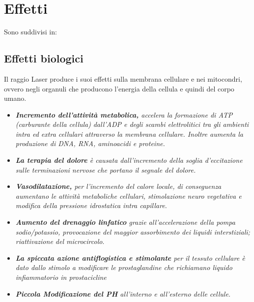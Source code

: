 \section{Effetti}

Sono suddivisi in:

\subsection{Effetti biologici}
Il raggio Laser produce i suoi effetti sulla
membrana cellulare e nei mitocondri, ovvero negli organuli che producono
l'energia della cellula e quindi del corpo umano.
\begin{itemize}
\item \emph{\textbf{Incremento dell'attività metabolica,} accelera la
formazione di ATP (carburante della cellula)} \emph{dall'ADP e degli scambi elettrolitici tra gli ambienti intra ed
extra cellulari attraverso la membrana cellulare. Inoltre aumenta la
produzione di DNA, RNA, aminoacidi e proteine.}
\item \emph{\textbf{La terapia del dolore} è causata dall'incremento della
soglia d'eccitazione sulle terminazioni nervose che portano il segnale
del dolore.}
\item \emph{\textbf{Vasodilatazione,} per l'incremento del calore locale, di
conseguenza aumentano le attività metaboliche cellulari, stimolazione
neuro vegetativa e modifica della pressione idrostatica intra
capillare.}
\item \emph{\textbf{Aumento del drenaggio linfatico} grazie
all'accelerazione della pompa sodio/potassio, provocazione del maggior
assorbimento dei liquidi interstiziali; riattivazione del microcircolo}.
\item \emph{\textbf{La spiccata azione antiflogistica e stimolante} per il
tessuto cellulare è dato dallo stimolo a modificare le prostaglandine
che richiamano liquido infiammatorio in prostacicline}
\item \emph{\textbf{Piccola Modificazione del PH} all'interno e all'esterno
delle cellule.}
\end{itemize}

